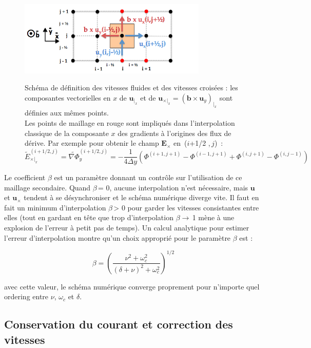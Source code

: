 \begin{refsection}
\begin{figure}[!htbp]
\centering
\includegraphics[width=0.8\textwidth]{figures/3-magnisVectCross.png}
{\captionsetup{justification=raggedright,
singlelinecheck=false}\label{3-magnisVectCross}\caption{Schéma de définition des vitesses fluides et des vitesses croisées : les composantes vectorielles en $x$ de $\mathbf
 u_{|_x}$ et de $\mathbf
 u_{\times|_x}=(\mathbf b\times\mathbf u_y)_{|_x}$ sont définies aux mêmes
 points. \\ Les points de maillage en rouge sont impliqués dans l'interpolation
 classique de la composante $x$ des gradients à l'origines des flux de dérive.
 Par exemple pour obtenir le champ $\mathbf{E}_\times$ en~($i$+1/2 ,$\,j$)~:
 $$\widetilde{E}_{\times|_x}^{(i+1/2,j)}={\widetilde{\nabla
 \Phi}}_y^{(i+1/2,j)}=-\frac{1}{4\Delta
 y}(\Phi^{(i+1,j+1)}-\Phi^{(i-1,j+1)}+\Phi^{(i,j+1)}-\Phi^{(i,j-1)})$$ }}
\end{figure}

Le coefficient $\beta$ est un paramètre donnant un contrôle sur
l'utilisation de ce maillage secondaire. Quand $\beta\,$= 0, aucune
interpolation n'est nécessaire, mais $\mathbf{u}$ et $\mathbf{u}_\times$
tendent à se désynchroniser et le schéma numérique diverge vite. Il faut en
fait un minimum d'interpolation $\beta\,$> 0 pour garder les vitesses
consistantes entre elles (tout en gardant en tête que trop d'interpolation
$\beta\rightarrow\,$1 mène à une explosion de l'erreur à petit pas de temps). Un
calcul analytique pour estimer l'erreur d'interpolation montre qu'un choix approprié pour le paramètre $\beta$
est :

\begin{equation}
\label{3-eqMvtPonderee3}
\beta=\left(\frac{\nu^2+\omega_c^2}{(\delta+\nu)^2+\omega_c^2}\right)^{1/2}
\end{equation}

avec cette valeur, le schéma numérique converge proprement pour n'importe quel
ordering entre $\nu$, $\omega_c$ et $\delta$.


\subsection{Conservation du courant et correction des vitesses}

\end{refsection}
